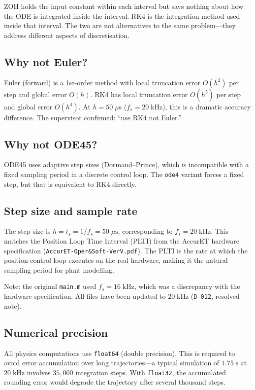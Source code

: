 \documentclass[11pt,a4paper]{article}
\newcommand{\ts}{t_s}
\newcommand{\fs}{f_s}
\newcommand{\decref}[1]{\texttt{D-#1}}
\begin{document}
ZOH holds the input constant within each interval but says nothing about how the ODE is
integrated inside the interval. RK4 is the integration method used inside that interval. The
two are not alternatives to the same problem---they address different aspects of discretisation.

\subsection{Why not Euler?}

Euler (forward) is a 1st-order method with local truncation error $O(h^2)$ per step and
global error $O(h)$. RK4 has local truncation error $O(h^5)$ per step and global error
$O(h^4)$. At $h = 50\;\mu\text{s}$ ($\fs = 20\;\text{kHz}$), this is a dramatic accuracy
difference. The supervisor confirmed: ``use RK4 not Euler.''

\subsection{Why not ODE45?}

ODE45 uses adaptive step sizes (Dormand--Prince), which is incompatible with a fixed sampling
period in a discrete control loop. The \texttt{ode4} variant forces a fixed step, but that is
equivalent to RK4 directly.

\subsection{Step size and sample rate}

The step size is $h = \ts = 1/\fs = 50\;\mu\text{s}$, corresponding to $\fs = 20\;\text{kHz}$.
This matches the Position Loop Time Interval (PLTI) from the AccurET hardware specification
(\texttt{AccurET-Oper\&Soft-VerV.pdf}). The PLTI is the rate at which the position control
loop executes on the real hardware, making it the natural sampling period for plant modelling.

Note: the original \texttt{main.m} used $\fs = 16\;\text{kHz}$, which was a discrepancy with
the hardware specification. All files have been updated to $20\;\text{kHz}$ (\decref{012},
resolved note).

\subsection{Numerical precision}

All physics computations use \texttt{float64} (double precision). This is required to avoid
error accumulation over long trajectories---a typical simulation of $1.75\;\text{s}$ at
$20\;\text{kHz}$ involves $35{,}000$ integration steps. With \texttt{float32}, the accumulated
rounding error would degrade the trajectory after several thousand steps.
\end{document}
